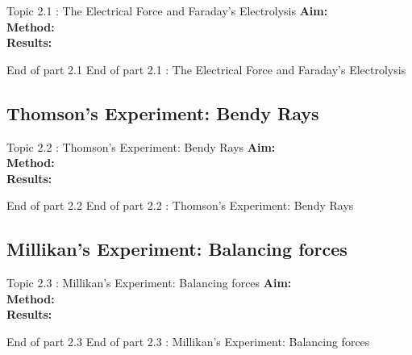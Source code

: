 \begin{frame}{Topic 2.1 : The Electrical Force and Faraday's Electrolysis}
\small
\textbf{Aim:}\\
\textbf{Method:}\\
\textbf{Results:}\\
\end{frame}


%  
\begin{frame}{}
\small

\end{frame}

 \begin{frame}{End of part 2.1}
End of part 2.1 : The Electrical Force and Faraday's Electrolysis\\[1ex]

\end{frame}



\subsection{Thomson's Experiment: Bendy Rays}

\begin{frame}{Topic 2.2 : Thomson's Experiment: Bendy Rays}
\small
\textbf{Aim:}\\
\textbf{Method:}\\
\textbf{Results:}\\
\end{frame}


\begin{frame}{}
\small

\end{frame}


 \begin{frame}{End of part 2.2}
End of part 2.2 : Thomson's Experiment: Bendy Rays\\[1ex]

\end{frame}



\subsection{Millikan's Experiment: Balancing forces}


\begin{frame}{Topic 2.3 : Millikan's Experiment: Balancing forces}
\small
\textbf{Aim:}\\
\textbf{Method:}\\
\textbf{Results:}\\
\end{frame}


\begin{frame}{}
\small

\end{frame}


 \begin{frame}{End of part 2.3}
End of part 2.3 : Millikan's Experiment: Balancing forces\\[1ex]

\end{frame}



 
